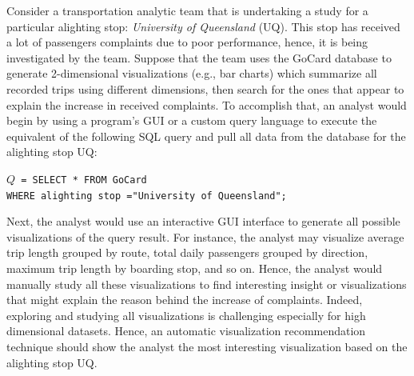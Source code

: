 \begin{example}
\label{ex:gocard}
%
Consider a transportation analytic team that is undertaking a study for a particular alighting stop: \emph{University of Queensland} (UQ).
%
This stop has received a lot of passengers complaints due to poor performance, hence, it is being investigated by the team.
%
Suppose that the team uses the GoCard database to generate 2-dimensional visualizations (e.g., bar charts) which summarize all recorded trips using different dimensions, then search for the ones that appear to explain the increase in received complaints. 
%
To accomplish that, an analyst would begin by using a program's GUI or a custom 
query language to execute the equivalent of the following SQL query and pull all data from the database for the alighting stop UQ:
%
\begin{center}
\texttt{$Q$ = SELECT * FROM GoCard \\ WHERE alighting stop ="University of Queensland";}
\end{center}
%
Next, the analyst would use an interactive GUI interface to generate all possible visualizations of the query result.
%
%
%
%
%
%
%
For instance, the analyst may visualize average trip length grouped by route, total daily passengers grouped by direction, maximum trip length by boarding stop, and so on. 
%
Hence, the analyst would manually study all these visualizations to find interesting insight or visualizations that might explain the  reason behind the increase of complaints.
%
Indeed, exploring and studying all visualizations is challenging especially for high dimensional datasets.  %
%
Hence, an automatic visualization recommendation technique should show the analyst the most interesting visualization based on the alighting stop UQ.
%
%


\end{example}

